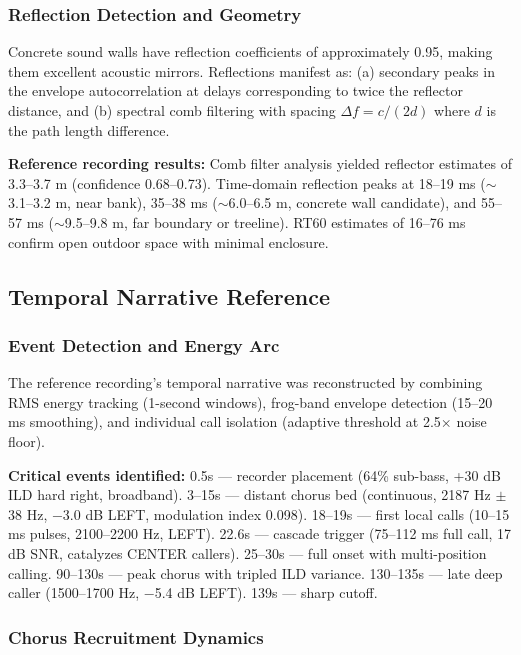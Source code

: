\documentclass[11pt,letterpaper]{article}
\begin{document}
\subsubsection{Reflection Detection and Geometry}

Concrete sound walls have reflection coefficients of approximately 0.95, making them excellent acoustic mirrors. Reflections manifest as: (a) secondary peaks in the envelope autocorrelation at delays corresponding to twice the reflector distance, and (b) spectral comb filtering with spacing $\Delta f = c / (2d)$ where $d$ is the path length difference.

\textbf{Reference recording results:} Comb filter analysis yielded reflector estimates of 3.3--3.7 m (confidence 0.68--0.73). Time-domain reflection peaks at 18--19 ms ($\sim$3.1--3.2 m, near bank), 35--38 ms ($\sim$6.0--6.5 m, concrete wall candidate), and 55--57 ms ($\sim$9.5--9.8 m, far boundary or treeline). RT60 estimates of 16--76 ms confirm open outdoor space with minimal enclosure.

\subsection{Temporal Narrative Reference}

\subsubsection{Event Detection and Energy Arc}

The reference recording's temporal narrative was reconstructed by combining RMS energy tracking (1-second windows), frog-band envelope detection (15--20 ms smoothing), and individual call isolation (adaptive threshold at 2.5$\times$ noise floor).

\textbf{Critical events identified:} 0.5s --- recorder placement (64\% sub-bass, +30 dB ILD hard right, broadband). 3--15s --- distant chorus bed (continuous, 2187 Hz $\pm$38 Hz, $-$3.0 dB LEFT, modulation index 0.098). 18--19s --- first local calls (10--15 ms pulses, 2100--2200 Hz, LEFT). 22.6s --- cascade trigger (75--112 ms full call, 17 dB SNR, catalyzes CENTER callers). 25--30s --- full onset with multi-position calling. 90--130s --- peak chorus with tripled ILD variance. 130--135s --- late deep caller (1500--1700 Hz, $-$5.4 dB LEFT). 139s --- sharp cutoff.

\subsubsection{Chorus Recruitment Dynamics}
\end{document}
